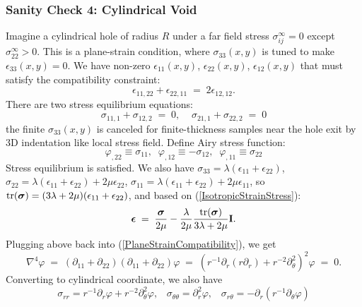 \documentclass[12pt]{article}
\def\bmath#1{\mbox{\boldmath$#1$}}
\begin{document}
\subsubsection{Sanity Check 4: Cylindrical Void}

Imagine a cylindrical hole of radius $R$ under a far field stress
$\sigma_{ij}^\infty=0$ except $\sigma_{22}^\infty>0$. This is a
plane-strain condition, where $\sigma_{33}(x,y)$ is tuned to make
$\epsilon_{33}(x,y)=0$.  We have non-zero $\epsilon_{11}(x,y)$,
$\epsilon_{22}(x,y)$, $\epsilon_{12}(x,y)$ that must satisfy the
compatibility constraint:
\begin{equation}
 \epsilon_{11,22} + \epsilon_{22,11} \;=\; 2\epsilon_{12,12}.
 \label{PlaneStrainCompatibility}
\end{equation}
There are two stress equilibrium equations:
\begin{equation}
 \sigma_{11,1} + \sigma_{12,2} \;=\; 0, \;\;\;\;
 \sigma_{21,1} + \sigma_{22,2} \;=\; 0
\end{equation}
the finite $\sigma_{33}(x,y)$ is canceled for finite-thickness samples
near the hole exit by 3D indentation like local stress field.  Define
Airy stress function:
\begin{equation}
 \varphi_{,22} \equiv \sigma_{11}, \;\;
 \varphi_{,12} \equiv -\sigma_{12}, \;\;
 \varphi_{,11} \equiv \sigma_{22}
\end{equation}
Stress equilibrium is satisfied. We also have
$\sigma_{33}=\lambda(\epsilon_{11}+\epsilon_{22})$,
$\sigma_{22}=\lambda(\epsilon_{11}+\epsilon_{22})+2\mu\epsilon_{22}$,
$\sigma_{11}=\lambda(\epsilon_{11}+\epsilon_{22})+2\mu\epsilon_{11}$,
so ${\rm tr}(\bmath{\sigma})=(3\lambda+2\mu)(\epsilon_{11}+\epsilon_{22})$, and
based on
(\ref{IsotropicStrainStress}):
\begin{equation}
  \bmath{\epsilon} \;=\; \frac{\bmath{\sigma}}{2\mu} - 
  \frac{\lambda}{2\mu}
 \frac{{\rm tr}(\bmath{\sigma})}{3\lambda+2\mu} {\bf I}.
\end{equation}
Plugging above back into (\ref{PlaneStrainCompatibility}), we get
\begin{equation}
 \nabla^4 \varphi \;=\;
 (\partial_{11}+\partial_{22})(\partial_{11}+\partial_{22}) \varphi
  \;=\;
 (r^{-1}\partial_r(r\partial_r)+r^{-2}\partial_\theta^2)^2 \varphi
 \;=\; 0.
 \label{AiryEquation}
\end{equation}
Converting to cylindrical coordinate, we also have 
\begin{equation}
 \sigma_{rr} = r^{-1}\partial_r\varphi + r^{-2}\partial_\theta^2\varphi, \;\;\;
 \sigma_{\theta\theta} = \partial_r^2 \varphi, \;\;\;
 \sigma_{r\theta} = -\partial_r(r^{-1}\partial_\theta\varphi)
\end{equation}
\end{document}
